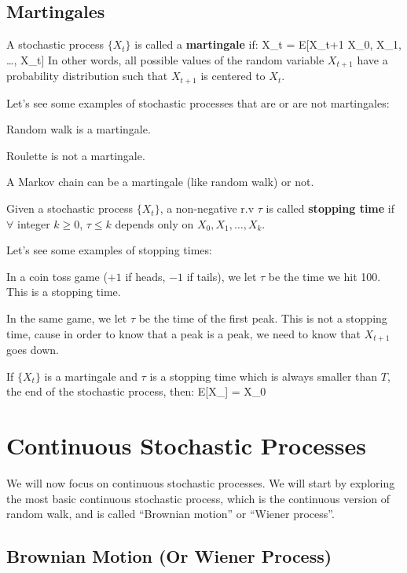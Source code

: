 \subsection{Martingales}

\bd[Martingale]
A stochastic process $\{ X_{t} \}$ is called a \textbf{martingale} if:
\bse
X_{t} = E[X_{t+1} \mid X_{0}, X_{1}, \ldots, X_{t}]
\ese
In other words, all possible values of the random variable $X_{t+1}$ have a probability distribution such that
$X_{t+1}$ is centered to $X_{t}$.
\ed

\be
Let's see some examples of stochastic processes that are or are not martingales:
\bit
\item Random walk is a martingale.
\item Roulette is not a martingale.
\item A Markov chain can be a martingale (like random walk) or not.
\eit
\ee

Given a stochastic process $\{ X_{t} \}$, a non-negative r.v $\tau$ is called \textbf{stopping time} if $\forall$
integer $k \geq 0$, $\tau \leq k$ depends only on $X_{0}, X_{1}, \ldots, X_{k}$.
\ed

\be
Let's see some examples of stopping times:
\bit
\item In a coin toss game ($+1$\texteuro{} if heads, $-1$\texteuro{} if tails), we let $\tau$ be the time we hit
100\texteuro{}. This is a stopping time.
\item In the same game, we let $\tau$ be the time of the first peak. This is not a stopping time, cause in order to
know that a peak is a peak, we need to know that $X_{t+1}$ goes down.
\eit
\ee

If $\{ X_{t} \}$ is a martingale and $\tau$ is a stopping time which is always smaller than $T$, the end of the
stochastic process, then:
\bse
E[X_{\tau}] = X_{0}
\ese
\et

\section{Continuous Stochastic Processes}

We will now focus on continuous stochastic processes. We will start by exploring the most basic continuous
stochastic process, which is the continuous version of random walk, and is called ``Brownian motion'' or ``Wiener
process''.

\subsection{Brownian Motion (Or Wiener Process)}

